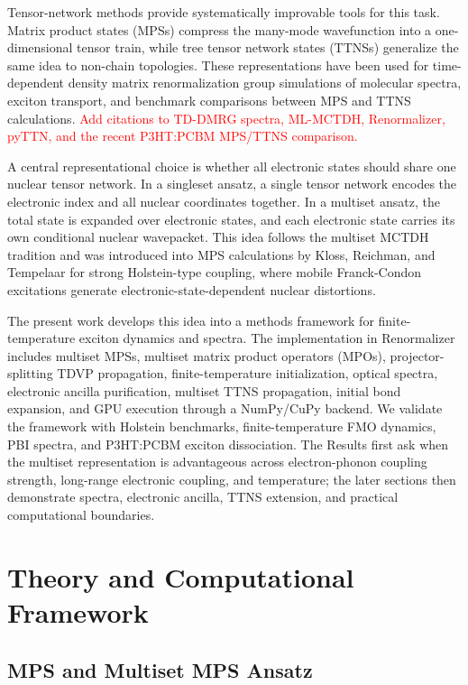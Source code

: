 \documentclass[journal=jctcce,manuscript=article]{achemso}
\newcommand{\placeholder}[1]{\textcolor{red}{#1}}
\begin{document}
Tensor-network methods provide systematically improvable tools for this task. Matrix product states (MPSs) compress the many-mode wavefunction into a one-dimensional tensor train, while tree tensor network states (TTNSs) generalize the same idea to non-chain topologies. These representations have been used for time-dependent density matrix renormalization group simulations of molecular spectra, exciton transport, and benchmark comparisons between MPS and TTNS calculations. \placeholder{Add citations to TD-DMRG spectra, ML-MCTDH, Renormalizer, pyTTN, and the recent P3HT:PCBM MPS/TTNS comparison.}

A central representational choice is whether all electronic states should share one nuclear tensor network. In a singleset ansatz, a single tensor network encodes the electronic index and all nuclear coordinates together. In a multiset ansatz, the total state is expanded over electronic states, and each electronic state carries its own conditional nuclear wavepacket. This idea follows the multiset MCTDH tradition and was introduced into MPS calculations by Kloss, Reichman, and Tempelaar for strong Holstein-type coupling, where mobile Franck-Condon excitations generate electronic-state-dependent nuclear distortions.\cite{PhysRevLett.123.126601}

The present work develops this idea into a methods framework for finite-temperature exciton dynamics and spectra. The implementation in Renormalizer includes multiset MPSs, multiset matrix product operators (MPOs), projector-splitting TDVP propagation, finite-temperature initialization, optical spectra, electronic ancilla purification, multiset TTNS propagation, initial bond expansion, and GPU execution through a NumPy/CuPy backend. We validate the framework with Holstein benchmarks, finite-temperature FMO dynamics, PBI spectra, and P3HT:PCBM exciton dissociation. The Results first ask when the multiset representation is advantageous across electron-phonon coupling strength, long-range electronic coupling, and temperature; the later sections then demonstrate spectra, electronic ancilla, TTNS extension, and practical computational boundaries.

\section{Theory and Computational Framework}


\subsection{MPS and Multiset MPS Ansatz}
\end{document}
